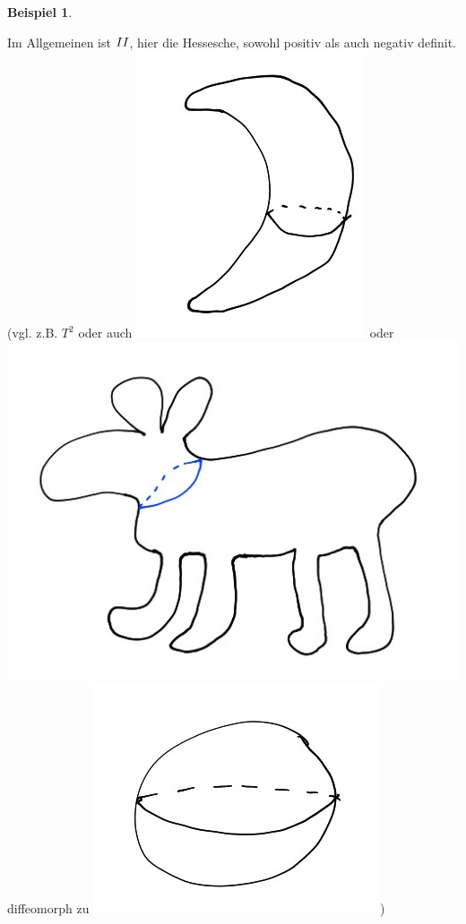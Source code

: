 \documentclass[a4paper,11pt,notitlepage]{report}
\theoremstyle{definition}
\newtheorem{example}{Beispiel}[chapter]
\newcommand{\RM}[1]{\MakeUppercase{\romannumeral #1{}}}
\begin{document}
\begin{example}
\begin{itemize}
	Im Allgemeinen ist $\RM{2}$, hier die Hessesche, sowohl positiv als auch negativ definit. (vgl. z.B. $T^2$ oder auch \includegraphics[scale=0.4]{images/2012_01_26_Bild7.jpg} oder \includegraphics[scale=0.4]{images/2012_01_26_Bild8.jpg} diffeomorph zu \includegraphics[scale=0.4]{images/2012_01_26_Bild9.jpg})
	\end{itemize}
\end{example}
\end{document}
